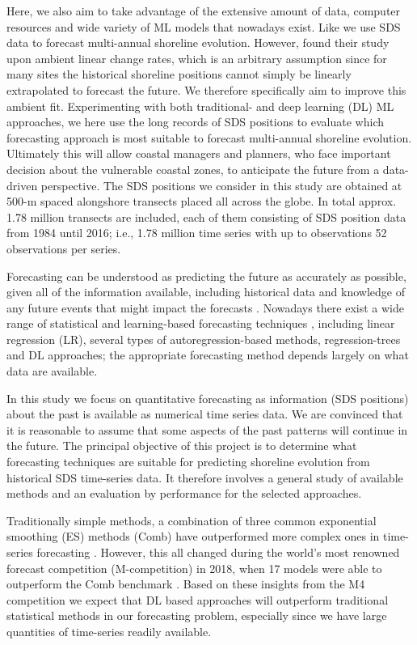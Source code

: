 \documentclass[format=sigconf, review=false, screen=true]{acmart}
\begin{document}
Here, we also aim to take advantage of the extensive amount of data, computer resources and wide variety of ML models that nowadays exist. Like \citet{vousdoukas2020sandy} we use \citet{Luijendijk2018state} SDS data to forecast multi-annual shoreline evolution. However, \citet{vousdoukas2020sandy} found their study upon ambient linear change rates, which is an arbitrary assumption since for many sites the historical shoreline positions cannot simply be linearly extrapolated to forecast the future. We therefore specifically aim to improve this ambient fit. Experimenting with both traditional- and deep learning (DL) ML approaches, we here use the long records of SDS positions \citep{Luijendijk2018state} to evaluate which forecasting approach is most suitable to forecast multi-annual shoreline evolution. Ultimately this will allow coastal managers and planners, who face important decision about the vulnerable coastal zones, to anticipate the future from a data-driven  perspective. The SDS positions \citep{Luijendijk2018state} we consider in this study are obtained at 500-m spaced alongshore transects placed all across the globe. In total approx. 1.78 million transects are included, each of them consisting of SDS position data from 1984 until 2016; i.e., 1.78 million time series with up to  observations 52 observations per series. 


Forecasting can be understood as predicting the future as accurately as possible, given all of the information available, including historical data and knowledge of any future
events that might impact the forecasts \citep{Hyndman2018forecasting}. Nowadays there exist a wide range of statistical and learning-based forecasting techniques \citep{Hyndman2018forecasting}, including linear regression (LR), several types of autoregression-based methods, regression-trees and DL approaches; the appropriate forecasting method depends largely on what data are available. 

In this study we focus on quantitative forecasting as information (SDS positions) about the past is available as numerical time series data. We are convinced that it is reasonable to assume that some aspects of the past patterns will continue in the future. The principal objective of this project is to determine what forecasting techniques are suitable for predicting shoreline evolution from historical SDS time-series data. It therefore involves a general study of available methods and an evaluation by performance for the selected approaches.

Traditionally simple methods, a combination of three common exponential smoothing (ES) methods (Comb) have outperformed more complex ones in time-series forecasting \citep{Clements2001explaining}. However, this all changed during the world's most renowned forecast competition (M-competition) in 2018, when 17 models were able to outperform the Comb benchmark \citep{Makridakis2018m4}. Based on these insights from the M4 competition we expect that DL based approaches will outperform traditional statistical methods in our forecasting problem, especially since we have large quantities of time-series readily available. 
\end{document}
